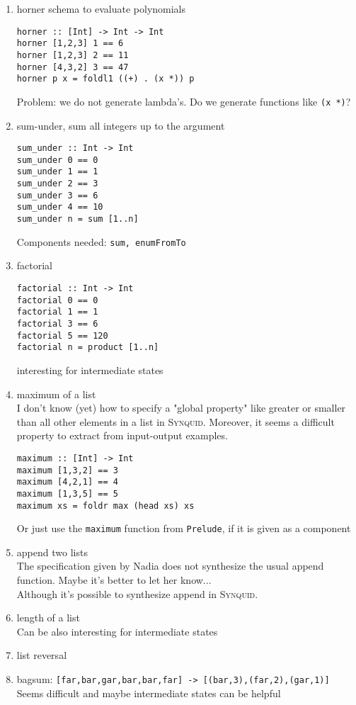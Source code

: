 \begin{enumerate}
%
	\item horner schema to evaluate polynomials
	\begin{lstlisting}
horner :: [Int] -> Int -> Int
horner [1,2,3] 1 == 6
horner [1,2,3] 2 == 11
horner [4,3,2] 3 == 47
horner p x = foldl1 ((+) . (x *)) p
	\end{lstlisting}
	Problem: we do not generate lambda's. Do we generate functions like \lstinline?(x *)??
%
	\item sum-under, sum all integers up to the argument
	\begin{lstlisting}
sum_under :: Int -> Int
sum_under 0 == 0
sum_under 1 == 1
sum_under 2 == 3
sum_under 3 == 6
sum_under 4 == 10
sum_under n = sum [1..n]
	\end{lstlisting}
	Components needed: \lstinline?sum, enumFromTo?
%
	\item factorial \\
	\begin{lstlisting}
factorial :: Int -> Int
factorial 0 == 0
factorial 1 == 1
factorial 3 == 6
factorial 5 == 120
factorial n = product [1..n]
	\end{lstlisting}
	interesting for intermediate states
%
	\item maximum of a list\\
	I don't know (yet) how to specify a "global property" like greater or smaller than all other elements in a list in \textsc{Synquid}. Moreover, it seems a difficult property to extract from input-output examples.
	\begin{lstlisting}
maximum :: [Int] -> Int
maximum [1,3,2] == 3
maximum [4,2,1] == 4
maximum [1,3,5] == 5
maximum xs = foldr max (head xs) xs
	\end{lstlisting}
	Or just use the \lstinline?maximum? function from \lstinline?Prelude?, if it is given as a component
%
	\item append two lists\\
	The specification given by Nadia does not synthesize the usual append function. Maybe it's better to let her know...\\
	Although it's possible to synthesize append in \textsc{Synquid}.
%
	\item length of a list \\
	Can be also interesting for intermediate states
%
	\item list reversal
%
	\item bagsum: \lstinline![far,bar,gar,bar,bar,far] -> [(bar,3),(far,2),(gar,1)]!\\
	Seems difficult and maybe intermediate states can be helpful

\end{enumerate}
